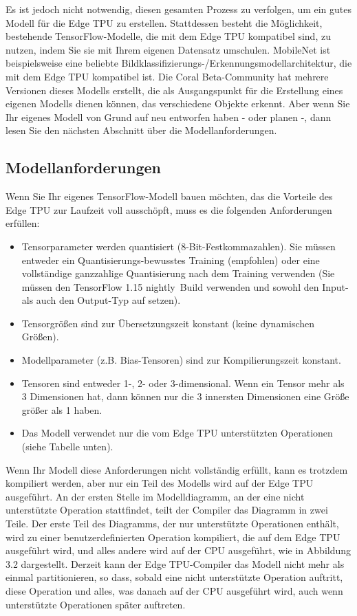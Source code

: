 Es ist jedoch nicht notwendig, diesen gesamten Prozess zu verfolgen, 
um ein gutes Modell für die Edge TPU zu erstellen. Stattdessen besteht 
die Möglichkeit, bestehende TensorFlow-Modelle, die mit dem Edge TPU 
kompatibel sind, zu nutzen, indem Sie sie mit Ihrem eigenen Datensatz 
umschulen. MobileNet ist beispielsweise eine beliebte 
Bildklassifizierungs-/Erkennungsmodellarchitektur, die mit dem Edge 
TPU kompatibel ist. Die Coral Beta-Community hat mehrere Versionen dieses 
Modells erstellt, die als Ausgangspunkt für die Erstellung eines eigenen 
Modells dienen können, das verschiedene Objekte erkennt. Aber wenn Sie 
Ihr eigenes Modell von Grund auf neu entworfen haben - oder planen -, 
dann lesen Sie den nächsten Abschnitt über die Modellanforderungen.

\subsection{Modellanforderungen}
Wenn Sie Ihr eigenes TensorFlow-Modell bauen möchten, das die Vorteile des Edge TPU zur Laufzeit voll ausschöpft, muss es die folgenden Anforderungen erfüllen:

\begin{itemize}
	\item Tensorparameter werden quantisiert (8-Bit-Festkommazahlen).
	Sie müssen entweder ein Quantisierungs-bewusstes Training 
	(empfohlen) oder eine vollständige ganzzahlige Quantisierung 
	nach dem Training verwenden (Sie müssen den TensorFlow 1.15
	\glqq nightly\grqq\, Build verwenden und sowohl den Input- als auch den 
	Output-Typ auf  setzen).
	\item Tensorgrößen sind zur Übersetzungszeit konstant (keine dynamischen Größen).
	\item Modellparameter (z.B. Bias-Tensoren) sind zur Kompilierungszeit konstant.
	\item Tensoren sind entweder 1-, 2- oder 3-dimensional. 
	Wenn ein Tensor mehr als 3 Dimensionen hat, dann können 
	nur die 3 innersten Dimensionen eine Größe größer als 1 haben.
	\item Das Modell verwendet nur die vom Edge TPU unterstützten Operationen (siehe Tabelle unten).
\end{itemize}

Wenn Ihr Modell diese Anforderungen nicht vollständig erfüllt, kann es trotzdem kompiliert werden, aber nur ein Teil des Modells wird auf der Edge TPU ausgeführt. An der ersten Stelle im Modelldiagramm, an der eine nicht unterstützte Operation stattfindet, teilt der Compiler das Diagramm in zwei Teile. Der erste Teil des Diagramms, der nur unterstützte Operationen enthält, wird zu einer benutzerdefinierten Operation kompiliert, die auf dem Edge TPU ausgeführt wird, und alles andere wird auf der CPU ausgeführt, wie in Abbildung 3.2 dargestellt.
Derzeit kann der Edge TPU-Compiler das Modell nicht mehr als einmal partitionieren, so dass, sobald eine nicht unterstützte Operation auftritt, diese Operation und alles, was danach auf der CPU ausgeführt wird, auch wenn unterstützte Operationen später auftreten.




